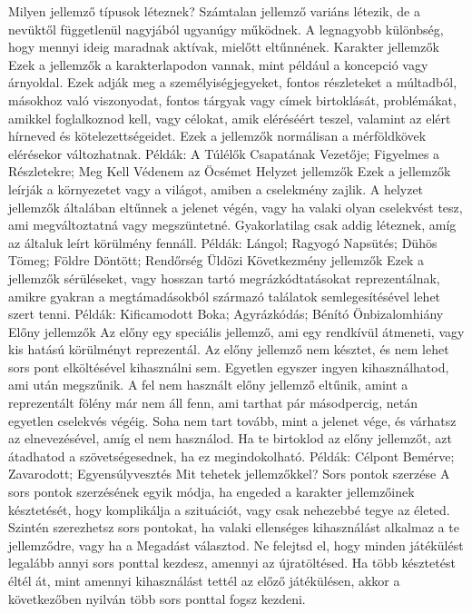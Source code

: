 \documentclass[oneside]{book}
\begin{document}
Milyen jellemző típusok léteznek?
Számtalan jellemző variáns létezik, de a nevüktől függetlenül nagyjából ugyanúgy működnek. A legnagyobb különbség, hogy mennyi ideig maradnak aktívak, mielőtt eltűnnének.
Karakter jellemzők
Ezek a jellemzők a karakterlapodon vannak, mint például a koncepció vagy árnyoldal. Ezek adják meg a személyiségjegyeket, fontos részleteket a múltadból, másokhoz való viszonyodat, fontos tárgyak vagy címek birtoklását, problémákat, amikkel foglalkoznod kell, vagy célokat, amik eléréséért teszel, valamint az elért hírneved és kötelezettségeidet. Ezek a jellemzők normálisan a mérföldkövek elérésekor változhatnak.
Példák: A Túlélők Csapatának Vezetője; Figyelmes a Részletekre; Meg Kell Védenem az Öcsémet
Helyzet jellemzők
Ezek a jellemzők leírják a környezetet vagy a világot, amiben a cselekmény zajlik. A helyzet jellemzők általában eltűnnek a jelenet végén, vagy ha valaki olyan cselekvést tesz, ami megváltoztatná vagy megszüntetné. Gyakorlatilag csak addig léteznek, amíg az általuk leírt körülmény fennáll.
Példák: Lángol; Ragyogó Napsütés; Dühös Tömeg; Földre Döntött; Rendőrség Üldözi
Következmény jellemzők
Ezek a jellemzők sérüléseket, vagy hosszan tartó megrázkódtatásokat reprezentálnak, amikre gyakran a megtámadásokból származó találatok semlegesítésével lehet szert tenni.
Példák: Kificamodott Boka; Agyrázkódás; Bénító Önbizalomhiány
Előny jellemzők
Az előny egy speciális jellemző, ami egy rendkívül átmeneti, vagy kis hatású körülményt reprezentál. Az előny jellemző nem késztet, és nem lehet sors pont elköltésével kihasználni sem. Egyetlen egyszer ingyen kihasználhatod, ami után megszűnik. A fel nem használt előny jellemző eltűnik, amint a reprezentált fölény már nem áll fenn, ami tarthat pár másodpercig, netán egyetlen cselekvés végéig. Soha nem tart tovább, mint a jelenet vége, és várhatsz az elnevezésével, amíg el nem használod. Ha te birtoklod az előny jellemzőt, azt átadhatod a szövetségesednek, ha ez megindokolható.
Példák: Célpont Bemérve; Zavarodott; Egyensúlyvesztés
Mit tehetek jellemzőkkel?
Sors pontok szerzése
A sors pontok szerzésének egyik módja, ha engeded a karakter jellemzőinek késztetését, hogy komplikálja a szituációt, vagy csak nehezebbé tegye az életed. Szintén szerezhetsz sors pontokat, ha valaki ellenséges kihasználást alkalmaz a te jellemződre, vagy ha a Megadást választod.
Ne felejtsd el, hogy minden játékülést legalább annyi sors ponttal kezdesz, amennyi az újratöltésed. Ha több késztetést éltél át, mint amennyi kihasználást tettél az előző játékülésen, akkor a következőben nyilván több sors ponttal fogsz kezdeni.
\end{document}
